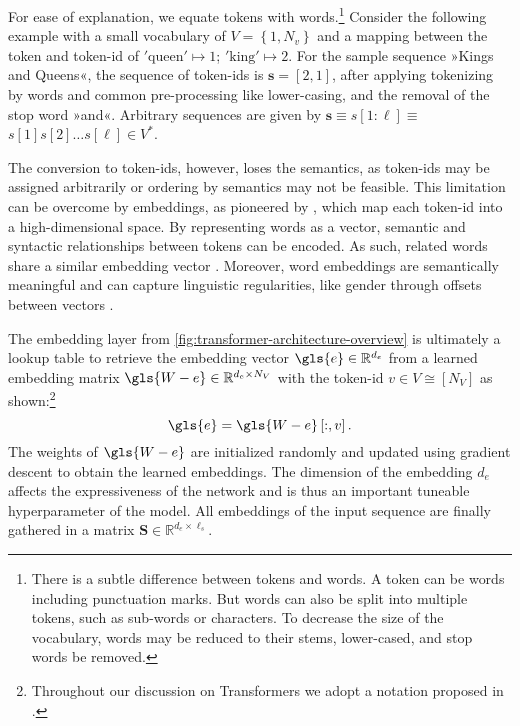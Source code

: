 For ease of explanation, we equate \glspl{token} with words.\footnote{There is a subtle difference between \glspl{token} and words. A \gls{token} can be words including punctuation marks. But words can also be split into multiple \glspl{token}, such as sub-words \autocite[][137]{bojanowskiEnrichingWordVectors2017} or characters. To decrease the size of the vocabulary, words may be reduced to their stems, lower-cased, and stop words be removed.} Consider the following example with a small vocabulary of $V=\left\{1, N_v\right\}$ and a mapping between the \gls{token} and token-id of $\mathrm{'queen'}\mapsto 1$; $\mathrm{'king'}\mapsto 2$. For the sample sequence »Kings and Queens«, the sequence of token-ids is $\mathbf{s}=[2, 1]$, after applying tokenizing by words and common pre-processing like lower-casing, and the removal of the stop word »and«. Arbitrary sequences are given by $\mathbf{s} \equiv s[1: \ell] \equiv$ $s[1] s[2] \ldots s[\ell] \in V^*$.

The conversion to token-ids, however, loses the semantics, as token-ids may be assigned arbitrarily or ordering by semantics may not be feasible. This limitation can be overcome by embeddings, as pioneered by \textcite[][1139]{bengioNeuralProbabilisticLanguage}, which map each token-id into a high-dimensional space. By representing words as a vector, semantic and syntactic relationships between tokens can be encoded. As such, related words share a similar embedding vector \autocite[][1139]{bengioNeuralProbabilisticLanguage}. Moreover, word embeddings are semantically meaningful and can capture linguistic regularities, like gender through offsets between vectors \autocite[][748--749]{mikolovLinguisticRegularitiesContinuous2013}.

The embedding layer from \cref{fig:transformer-architecture-overview} is ultimately a lookup table to retrieve the embedding vector $\gls{e} \in \mathbb{R}^{d_{e}}$ from a learned embedding matrix $\gls{W-e} \in \mathbb{R}^{d_{e} \times N_{V}}$ with the token-id $v \in V \cong\left[N_{V}\right]$ as shown:\footnote{Throughout our discussion on Transformers we adopt a notation proposed in \textcite[][1--16]{phuongFormalAlgorithmsTransformers2022}.}
\begin{equation}
    \gls{e}=\gls{W-e}\left[:, v\right].
    \label{eq:word-embeddings}
\end{equation}
The weights of $\gls{W-e}$ are initialized randomly and updated using gradient descent to obtain the learned embeddings. The dimension of the embedding $d_e$ affects the expressiveness of the network and is thus an important tuneable hyperparameter of the model. All embeddings of the input sequence are finally gathered in a matrix $\mathbf{S} \in \mathbb{R}^{d_e \times \ell_s}$.

